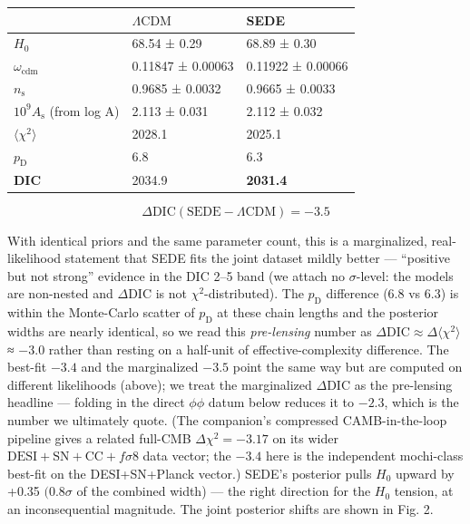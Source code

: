 \documentclass[preprint,12pt]{elsarticle}
\begin{document}
\begin{longtable}[]{@{}lll@{}}
\toprule\noalign{}
& \(\Lambda \mathrm{CDM}\) & SEDE \\
\midrule\noalign{}
\endhead
\bottomrule\noalign{}
\endlastfoot
\(H_{0}\) & 68.54 ± 0.29 & 68.89 ± 0.30 \\
\(\omega _{\mathrm{cdm}}\) & 0.11847 ± 0.00063 & 0.11922 ± 0.00066 \\
\(n_{\mathrm{s}}\) & 0.9685 ± 0.0032 & 0.9665 ± 0.0033 \\
\(10^{9}A_{\mathrm{s}}\) (from log A) & 2.113 ± 0.031 & 2.112 ± 0.032 \\
\(\langle\chi^2\rangle\) & 2028.1 & 2025.1 \\
\(p_{\mathrm{D}}\) & 6.8 & 6.3 \\
\textbf{DIC} & 2034.9 & \textbf{2031.4} \\
\end{longtable}

\begin{equation}\Delta\mathrm{DIC}(\mathrm{SEDE}-\Lambda\mathrm{CDM}) = -3.5\end{equation}

With identical priors and the same parameter count, this is a
marginalized, real-likelihood statement that SEDE fits the joint dataset
mildly better --- ``positive but not strong'' evidence in the DIC 2--5
band \citep{Spiegelhalter:2002bk} (we attach no \(\sigma\)-level: the
models are non-nested and \(\Delta \mathrm{DIC}\) is not
\(\chi ^{2}\)-distributed). The \(p_{\mathrm{D}}\) difference (6.8 vs
6.3) is within the Monte-Carlo scatter of \(p_{\mathrm{D}}\) at these
chain lengths and the posterior widths are nearly identical, so we read
this \emph{pre-lensing} number as
\(\Delta \mathrm{DIC} \approx  \Delta\)\(\langle\chi^2\rangle\) ≈ −3.0
rather than resting on a half-unit of effective-complexity difference.
The best-fit \(-3.4\) and the marginalized \(-3.5\) point the same way
but are computed on different likelihoods (above); we treat the
marginalized \(\Delta \mathrm{DIC}\) as the pre-lensing headline ---
folding in the direct \(\phi \phi\) datum below reduces it to \(-2.3\),
which is the number we ultimately quote. (The companion's compressed
CAMB-in-the-loop pipeline gives a related full-CMB
\(\Delta \chi ^{2} = -3.17\) on its wider
\(\mathrm{DESI}+\mathrm{SN}+\mathrm{CC}+f\sigma 8\) data vector; the
\(-3.4\) here is the independent mochi-class best-fit on the
DESI+SN+Planck vector.) SEDE's posterior pulls \(H_{0}\) upward by +0.35
\((0.8\sigma\) of the combined width) --- the right direction for the
\(H_{0}\) tension, at an inconsequential magnitude. The joint posterior
shifts are shown in Fig. 2.
\end{document}
